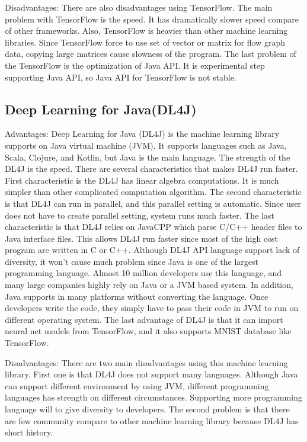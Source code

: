 \documentclass[onecolumn, draftclsnofoot,10pt, compsoc]{IEEEtran}
\begin{document}
Disadvantages: There are also disadvantages using TensorFlow. The main problem with TensorFlow is the speed. It has dramatically slower speed compare of other frameworks. Also, TensorFlow is heavier than other machine learning libraries. Since TensorFlow force to use set of vector or matrix for flow graph data, copying large matrices cause slowness of the program. The last problem of the TensorFlow is the optimization of Java API. It is experimental step supporting Java API, so Java API for TensorFlow is not stable.

\subsection{Deep Learning for Java(DL4J)}
 Advantages: Deep Learning for Java (DL4J) is the machine learning library supports on Java virtual machine (JVM). It supports languages such as Java, Scala, Clojure, and Kotlin, but Java is the main language. The strength of the DL4J is the speed. There are several characteristics that makes DL4J run faster. First characteristic is the DL4J has linear algebra computations. It is much simpler than other complicated computation algorithm. The second characteristic is that DL4J can run in parallel, and this parallel setting is automatic. Since user does not have to create parallel setting, system runs much faster. The last characteristic is that DL4J relies on JavaCPP which parse C/C++ header files to Java interface files. This allows DL4J run faster since most of the high cost program are written in C or C++.
Although DL4J API language support lack of diversity, it won’t cause much problem since Java is one of the largest programming language. Almost 10 million developers use this language, and many large companies highly rely on Java or a JVM based system. In addition, Java supports in many platforms without converting the language. Once developers write the code, they simply have to pass their code in JVM to run on different operating system.
The last advantage of DL4J is that it can import neural net models from TensorFlow, and it also supports MNIST database like TensorFlow.

Disadvantages: There are two main disadvantages using this machine learning library. First one is that DL4J does not support many languages. Although Java can support different environment by using JVM, different programming languages has strength on different circumstances. Supporting more programming language will to give diversity to developers. The second problem is that there are few community compare to other machine learning library because DL4J has short history.
\end{document}
